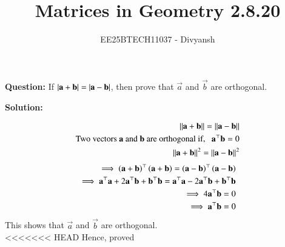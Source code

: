 \documentclass[journal,12pt,onecolumn]{IEEEtran}
\title{Matrices in Geometry 2.8.20}
\author{EE25BTECH11037 - Divyansh}
\theoremstyle{remark}
\begin{document}
\vspace{3cm}
\maketitle
{\let\newpage\relax\maketitle}
\textbf{Question: }
If $\left\vert\mathbf{a}+\mathbf{b}\right\vert=\left\vert\mathbf{a}-\mathbf{b}\right\vert$, then prove that $\vec{a}$ and $\vec{b}$ are orthogonal.
\vspace{2mm}

\textbf{Solution:}
 
\begin{align}
    \norm{\vec{a}+\vec{b}}=\norm{\vec{a}-\vec{b}}\\
    \text{Two vectors $\vec{a}$ and $\vec{b}$ are orthogonal if,} \ \ \ \vec{a}^{\top}\vec{b}=0\\
    \norm{\vec{a}+\vec{b}}^2=\norm{\vec{a}-\vec{b}}^2 
\end{align}
\begin{align}
    \implies \left(\mathbf{a}+\mathbf{b}\right)^{\top}\left(\mathbf{a}+\mathbf{b}\right)= \left(\mathbf{a}-\mathbf{b}\right)^{\top}\left(\mathbf{a}-\mathbf{b}\right)\\
    \implies \mathbf{a}^{\top}\mathbf{a} + 2\mathbf{a}^{\top}\mathbf{b}+ \mathbf{b}^{\top}\mathbf{b}=\mathbf{a}^{\top}\mathbf{a} - 2\mathbf{a}^{\top}\mathbf{b}+ \mathbf{b}^{\top}\mathbf{b}\\
    \implies 4\mathbf{a}^{\top}\mathbf{b}=0\\
    \implies \mathbf{a}^{\top}\mathbf{b}=0
\end{align}
This shows that $\vec{a}$ and $\vec{b}$ are orthogonal.\\
<<<<<<< HEAD
Hence, proved
\end{document}
